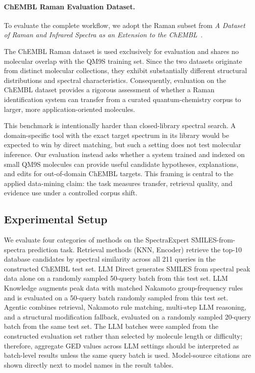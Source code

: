 \documentclass[conference]{IEEEtran}
\begin{document}
\paragraph{ChEMBL Raman Evaluation Dataset.}

To evaluate the complete workflow, we adopt the Raman subset from \emph{A Dataset of Raman and Infrared Spectra as an Extension to the ChEMBL}~\cite{liang2025dataset}.

The ChEMBL Raman dataset is used exclusively for evaluation and shares no molecular overlap with the QM9S training set. Since the two datasets originate from distinct molecular collections, they exhibit substantially different structural distributions and spectral characteristics. Consequently, evaluation on the ChEMBL dataset provides a rigorous assessment of whether a Raman identification system can transfer from a curated quantum-chemistry corpus to larger, more application-oriented molecules.

This benchmark is intentionally harder than closed-library spectral search. A domain-specific tool with the exact target spectrum in its library would be expected to win by direct matching, but such a setting does not test molecular inference. Our evaluation instead asks whether a system trained and indexed on small QM9S molecules can provide useful candidate hypotheses, explanations, and edits for out-of-domain ChEMBL targets. This framing is central to the applied data-mining claim: the task measures transfer, retrieval quality, and evidence use under a controlled corpus shift.

\subsection{Experimental Setup}

We evaluate four categories of methods on the SpectraExpert SMILES-from-spectra prediction task. Retrieval methods (KNN, Encoder) retrieve the top-10 database candidates by spectral similarity across all 211 queries in the constructed ChEMBL test set. LLM Direct generates SMILES from spectral peak data alone on a randomly sampled 50-query batch from this test set. LLM Knowledge augments peak data with matched Nakamoto group-frequency rules and is evaluated on a 50-query batch randomly sampled from this test set. Agentic combines retrieval, Nakamoto rule matching, multi-step LLM reasoning, and a structural modification fallback, evaluated on a randomly sampled 20-query batch from the same test set. The LLM batches were sampled from the constructed evaluation set rather than selected by molecule length or difficulty; therefore, aggregate GED values across LLM settings should be interpreted as batch-level results unless the same query batch is used. Model-source citations are shown directly next to model names in the result tables.
\end{document}

